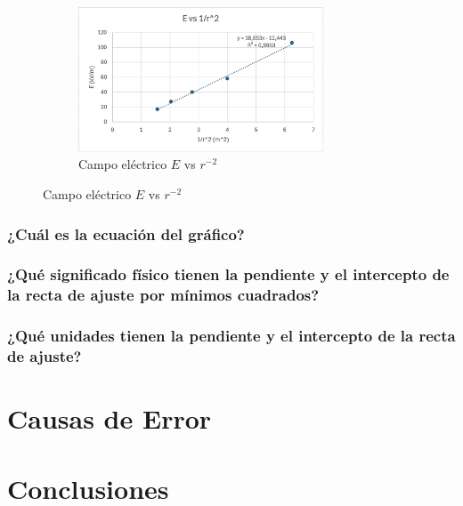\begin{figure}[H]
    \centering
    \begin{subfigure}[b]{\textwidth}
        \centering
        \includegraphics[width=0.8\textwidth]{Figures/1. Content/campoVSR2.png}
        \caption{Campo eléctrico $E$ vs $r^{-2}$}
        \label{fig: Campo vs r^-2}
    \end{subfigure}
    \hfill
\end{figure}

\subsubsection{¿Cuál es la ecuación del gráfico?}
\subsubsection{¿Qué significado físico tienen la pendiente y el intercepto de la recta de ajuste
por mínimos cuadrados?}
\subsubsection{¿Qué unidades tienen la pendiente y el intercepto de la recta de ajuste?}

\section{Causas de Error}
\section{Conclusiones}